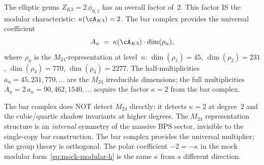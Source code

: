 \begin{remark}[The factor $2$ in $Z_{K3} = 2\,\phi_{0,1}$ is $\kappa$]
\label{rem:factor-2-is-kappa}
The elliptic genus $Z_{K3} = 2\,\phi_{0,1}$ has an overall
factor of~$2$. This factor IS the modular characteristic:
$\kappa(\cA_{K3}) = 2$. The bar complex provides the
universal coefficient
\begin{equation}\label{eq:moonshine-multiplier}
A_n \;=\; \kappa(\cA_{K3}) \cdot \dim(\rho_n),
\end{equation}
where $\rho_n$ is the $M_{24}$-representation at level~$n$:
$\dim(\rho_1) = 45$, $\dim(\rho_2) = 231$,
$\dim(\rho_3) = 770$, $\dim(\rho_4) = 2277$. The
half-multiplicities $a_n = 45, 231, 770, \ldots$ are the
$M_{24}$ irreducible dimensions; the full multiplicities
$A_n = 2\,a_n = 90, 462, 1540, \ldots$ acquire the factor
$\kappa = 2$ from the bar complex.

The bar complex does NOT detect $M_{24}$ directly: it
detects $\kappa = 2$ at degree~$2$ and the cubic/quartic
shadow invariants at higher degrees. The $M_{24}$
representation structure is an \emph{internal} symmetry of
the massive BPS sector, invisible to the single-copy bar
construction. The bar complex provides the universal
multiplier; the group theory is orthogonal. The polar
coefficient $-2 = -\kappa$ in the mock modular
form~\eqref{eq:mock-modular-h} is the same $\kappa$
from a different direction.
\end{remark}

